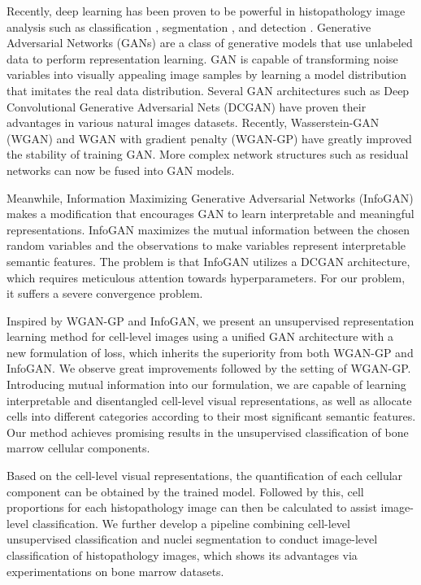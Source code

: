 \documentclass[journal]{IEEEtran}
\begin{document}
Recently, deep learning has been proven to be powerful in histopathology image analysis such as classification \cite{Xu2014Deep,xu2015deep}, segmentation \cite{xu2016deep,Chen2016DCAN}, and detection \cite{chen2014deep,cirecsan2013mitosis}. Generative Adversarial Networks (GANs) \cite{goodfellow2014generative} are a class of generative models that use unlabeled data to perform representation learning. GAN is capable of transforming noise variables into visually appealing image samples by learning a model distribution that imitates the real data distribution. Several GAN architectures such as Deep Convolutional Generative Adversarial Nets (DCGAN) \cite{radford2015unsupervised} have proven their advantages in various natural images datasets. Recently, Wasserstein-GAN (WGAN) \cite{arjovsky2017wasserstein} and WGAN with gradient penalty (WGAN-GP) \cite{gulrajani2017improved} have greatly improved the stability of training GAN. More complex network structures such as residual networks \cite{he2016deep} can now be fused into GAN models.

Meanwhile, Information Maximizing Generative Adversarial Networks (InfoGAN) \cite{chen2016infoGAN} makes a modification that encourages GAN to learn interpretable and meaningful representations. InfoGAN maximizes the mutual information between the chosen random variables and the observations to make variables represent interpretable semantic features. The problem is that InfoGAN utilizes a DCGAN architecture, which requires meticulous attention towards hyperparameters. For our problem, it suffers a severe convergence problem.





Inspired by WGAN-GP and InfoGAN, we present an unsupervised representation learning method for cell-level images using a unified GAN architecture with a new formulation of loss, which inherits the superiority from both WGAN-GP and InfoGAN. We observe great improvements followed by the setting of WGAN-GP. Introducing mutual information into our formulation, we are capable of learning interpretable and disentangled cell-level visual representations, as well as allocate cells into different categories according to their most significant semantic features. Our method achieves promising results in the unsupervised classification of bone marrow cellular components.

Based on the cell-level visual representations, the quantification of each cellular component can be obtained by the trained model. Followed by this, cell proportions for each histopathology image can then be calculated to assist image-level classification. We further develop a pipeline combining cell-level unsupervised classification and nuclei segmentation to conduct image-level classification of histopathology images, which shows its advantages via experimentations on bone marrow datasets.
\end{document}
